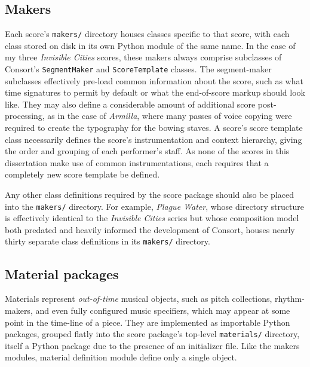 \subsection{Makers}
\label{ssec:makers}

Each score's \texttt{makers/} directory houses classes specific to that score,
with each class stored on disk in its own Python module of the same name. In
the case of my three \emph{Invisible Cities} scores, these makers always
comprise subclasses of Consort's \texttt{SegmentMaker} and
\texttt{ScoreTemplate} classes. The segment-maker subclasses effectively
pre-load common information about the score, such as what time signatures to
permit by default or what the end-of-score markup should look like. They may
also define a considerable amount of additional score post-processing, as in
the case of \emph{Armilla}, where many passes of voice copying were required to
create the typography for the bowing staves. A score's score template class
necessarily defines the score's instrumentation and context hierarchy, giving
the order and grouping of each performer's staff. As none of the scores in this
dissertation make use of common instrumentations, each requires that a
completely new score template be defined.

Any other class definitions required by the score package should also be placed
into the \texttt{makers/} directory. For example, \emph{Plague Water}, whose
directory structure is effectively identical to the \emph{Invisible Cities}
series but whose composition model both predated and heavily informed the
development of Consort, houses nearly thirty separate class definitions in its
\texttt{makers/} directory.

\subsection{Material packages}
\label{ssec:material-packages}

Materials represent \emph{out-of-time} musical objects, such as pitch
collections, rhythm-makers, and even fully configured music specifiers, which
may appear at some point in the time-line of a piece. They are implemented as
importable Python packages, grouped flatly into the score package's top-level
\texttt{materials/} directory, itself a Python package due to the presence of
an initializer file. Like the makers modules, material definition module
define only a single object.

